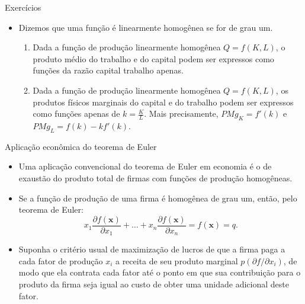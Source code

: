 \documentclass[10pt]{beamer}
\begin{document}
\begin{frame}[t]{Exercícios}
    \begin{itemize}
        \item Dizemos que uma função é linearmente homogênea se for de grau um.
        \bigskip
        \begin{enumerate}
            \item Dada a função de produção linearmente homogênea $Q = f(K,L)$, o produto médio do trabalho e do capital podem ser expressos como funções da razão capital trabalho apenas.
            \bigskip
            \item Dada a função de produção linearmente homogênea $Q = f(K,L)$, os produtos físicos marginais do capital e do trabalho podem ser expressos como funções apenas de $k = \frac{K}{L}$. Mais precisamente, $PMg_K = f'(k)$ e $PMg_L = f(k) - kf'(k)$.
        \end{enumerate}
    \end{itemize}
\end{frame}

\begin{frame}{Aplicação econômica do teorema de Euler}
    \begin{itemize}
        \item Uma aplicação convencional do teorema de Euler em economia é o de exaustão do produto total de firmas com funções de produção homogêneas.
        \bigskip
        \item Se a função de produção de uma firma é homogênea de grau um, então, pelo teorema de Euler:
        \[
        x_1 \frac{\partial f(\mathbf{x})}{\partial x_1} + \dots + x_n \frac{\partial f(\mathbf{x})}{\partial x_n} = f(\mathbf{x}) = q.
        \]
         
        \item Suponha o critério usual de maximização de lucros de que a firma paga a cada fator de produção $x_i$ a receita de seu produto marginal $p (\partial f/\partial x_i)$, de modo que ela contrata cada fator até o ponto em que sua contribuição para o produto da firma seja igual ao custo de obter uma unidade adicional deste fator.
    \end{itemize}
\end{frame}
\end{document}
